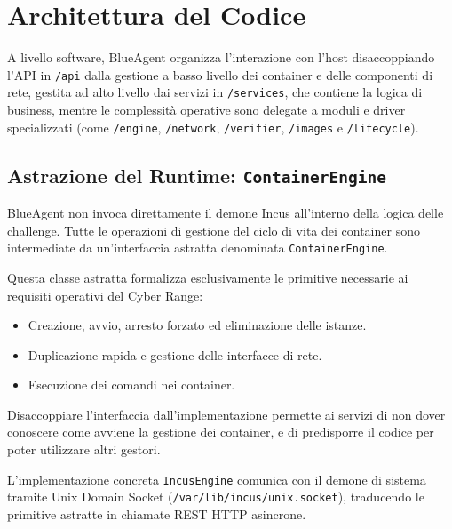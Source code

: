 \section{Architettura del Codice}\label{architettura-del-codice}

A livello software, BlueAgent organizza l'interazione con l'host
disaccoppiando l'API in \passthrough{\lstinline!/api!} dalla gestione a
basso livello dei container e delle componenti di rete, gestita ad alto
livello dai servizi in \passthrough{\lstinline!/services!}, che contiene
la logica di business, mentre le complessità operative sono delegate a
moduli e driver specializzati (come \passthrough{\lstinline!/engine!},
\passthrough{\lstinline!/network!}, \passthrough{\lstinline!/verifier!},
\passthrough{\lstinline!/images!} e
\passthrough{\lstinline!/lifecycle!}).

\subsection{\texorpdfstring{Astrazione del Runtime:
\texttt{ContainerEngine}}{Astrazione del Runtime: ContainerEngine}}\label{astrazione-del-runtime-containerengine}

BlueAgent non invoca direttamente il demone Incus all'interno della
logica delle challenge. Tutte le operazioni di gestione del ciclo di
vita dei container sono intermediate da un'interfaccia astratta
denominata \passthrough{\lstinline!ContainerEngine!}.

Questa classe astratta formalizza esclusivamente le primitive necessarie
ai requisiti operativi del Cyber Range:

\begin{itemize}
\tightlist
\item
  Creazione, avvio, arresto forzato ed eliminazione delle istanze.
\item
  Duplicazione rapida e gestione delle interfacce di rete.
\item
  Esecuzione dei comandi nei container.
\end{itemize}

Disaccoppiare l'interfaccia dall'implementazione permette ai servizi di
non dover conoscere come avviene la gestione dei container, e di
predisporre il codice per poter utilizzare altri gestori.

L'implementazione concreta \passthrough{\lstinline!IncusEngine!}
comunica con il demone di sistema tramite Unix Domain Socket
(\passthrough{\lstinline!/var/lib/incus/unix.socket!}), traducendo le
primitive astratte in chiamate REST HTTP asincrone.

